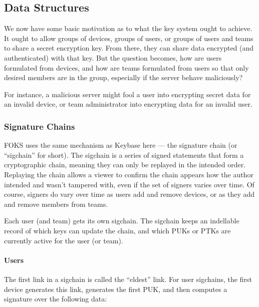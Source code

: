 \subsection{Data Structures}

We now have some basic motivation as to what the key system ought to achieve.
It ought to allow groups of devices, groups of users, or groups of users
and teams to share a secret encryption key. From there, they can share data
encrypted (and authenticated) with that key. But the question becomes,
how are users formulated from devices, and how are teams formulated from users
so that only desired members are in the group, especially if the server
behave maliciously?

For instance, a malicious server might fool a user into encrypting secret data
for an invalid device, or team administrator into encrypting data for an invalid
user.

\subsubsection{Signature Chains}
\label{sec:sigchains}

FOKS uses the same mechanism as Keybase here --- the signature chain (or
``sigchain'' for short).  The sigchain is a series of signed statements that
form a cryptographic chain, meaning they can only be replayed in the intended
order. Replaying the chain allows a viewer to confirm the chain appears how the
author intended and wasn't tampered with, even if the set of signers varies over
time. Of course, signers do vary over time as users add and remove devices, or
as they add and remove members from teams.

Each user (and team) gets its own sigchain. The sigchain keeps an indellable record
of which keys can update the chain, and which PUKs or PTKs are currently
active for the user (or team).

\paragraph{Users} The first link in a sigchain is called the ``eldest'' link. For user sigchains,
the first device generates this link, generates the first PUK, and then computes
a signature over the following data:

